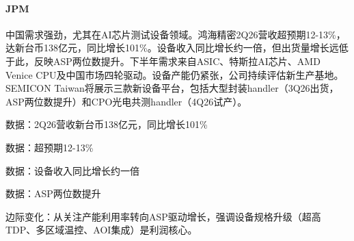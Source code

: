 \documentclass[11pt]{ctexart}
\begin{document}
\paragraph{JPM} 中国需求强劲，尤其在AI芯片测试设备领域。鸿海精密2Q26营收超预期12-13\%，达新台币138亿元，同比增长101\%。设备收入同比增长约一倍，但出货量增长远低于此，反映ASP两位数提升。下半年需求来自ASIC、特斯拉AI芯片、AMD Venice CPU及中国市场四轮驱动。设备产能仍紧张，公司持续评估新生产基地。SEMICON Taiwan将展示三款新设备平台，包括大型封装handler（3Q26出货，ASP两位数提升）和CPO光电共测handler（4Q26试产）。
{\small\color{refgray}数据：2Q26营收新台币138亿元，同比增长101\%\par}
{\small\color{refgray}数据：超预期12-13\%\par}
{\small\color{refgray}数据：设备收入同比增长约一倍\par}
{\small\color{refgray}数据：ASP两位数提升\par}
{\small\color{refgray}边际变化：从关注产能利用率转向ASP驱动增长，强调设备规格升级（超高TDP、多区域温控、AOI集成）是利润核心。\par}
\end{document}
